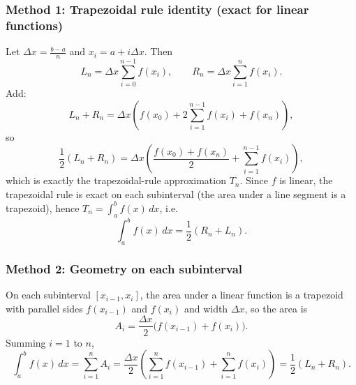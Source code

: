 \documentclass[12pt]{article}
\begin{document}
\subsubsection*{Method 1: Trapezoidal rule identity (exact for linear functions)}

Let \(\Delta x=\frac{b-a}{n}\) and \(x_i=a+i\Delta x\).
Then
\[
L_n = \Delta x\sum_{i=0}^{n-1} f(x_i),
\qquad
R_n = \Delta x\sum_{i=1}^{n} f(x_i).
\]
Add:
\[
L_n+R_n = \Delta x\left(f(x_0)+2\sum_{i=1}^{n-1} f(x_i)+f(x_n)\right),
\]
so
\[
\frac{1}{2}(L_n+R_n) = \Delta x\left(\frac{f(x_0)+f(x_n)}{2}+\sum_{i=1}^{n-1} f(x_i)\right),
\]
which is exactly the trapezoidal-rule approximation \(T_n\).
Since \(f\) is linear, the trapezoidal rule is exact on each subinterval (the area under a line segment is a trapezoid), hence \(T_n=\int_a^b f(x)\,dx\), i.e.
\[
\int_a^b f(x)\,dx = \frac{1}{2}(R_n+L_n).
\]

\subsubsection*{Method 2: Geometry on each subinterval}

On each subinterval \([x_{i-1},x_i]\), the area under a linear function is a trapezoid with parallel sides \(f(x_{i-1})\) and \(f(x_i)\) and width \(\Delta x\), so the area is
\[
A_i=\frac{\Delta x}{2}\bigl(f(x_{i-1})+f(x_i)\bigr).
\]
Summing \(i=1\) to \(n\),
\[
\int_a^b f(x)\,dx=\sum_{i=1}^n A_i
=\frac{\Delta x}{2}\left(\sum_{i=1}^n f(x_{i-1})+\sum_{i=1}^n f(x_i)\right)
=\frac{1}{2}(L_n+R_n).
\]
\end{document}

